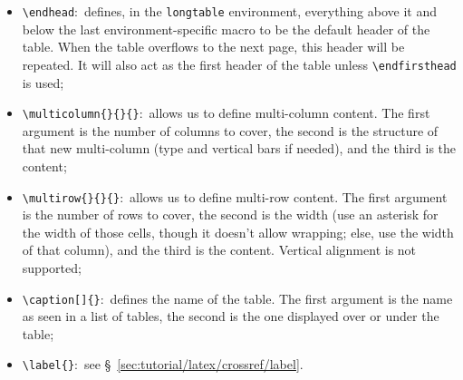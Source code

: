 \begin{itemize}
    \item \texttt{\textbackslash{}endhead}:~defines, in the \texttt{longtable} \gls{environment}, everything above it and below the last \gls{environment}-specific \gls{macro} to be the default header of the table. When the table overflows to the next page, this header will be repeated. It will also act as the first header of the table unless \texttt{\textbackslash{}endfirsthead} is used;
    \item \texttt{\textbackslash{}multicolumn\{\}\{\}\{\}}:~allows us to define multi-column content. The first \gls{argument} is the number of columns to cover, the second is the structure of that new multi-column (type and vertical bars if needed), and the third is the content;
    \item \texttt{\textbackslash{}multirow\{\}\{\}\{\}}:~allows us to define multi-row content. The first \gls{argument} is the number of rows to cover, the second is the width (use an asterisk for the  width of those cells, though it doesn't allow wrapping; else, use the width of that column), and the third is the content. Vertical alignment is not supported;
    \item \texttt{\textbackslash{}caption[]\{\}}:~defines the name of the table. The first \gls{argument} is the name as seen in a list of tables, the second is the one displayed over or under the table;
    \item \texttt{\textbackslash{}label\{\}}:~see \S~\ref{sec:tutorial/latex/crossref/label}.
\end{itemize}